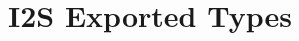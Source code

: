 \hypertarget{group___i2_s_ex___exported___types}{}\section{I2S Exported Types}
\label{group___i2_s_ex___exported___types}
